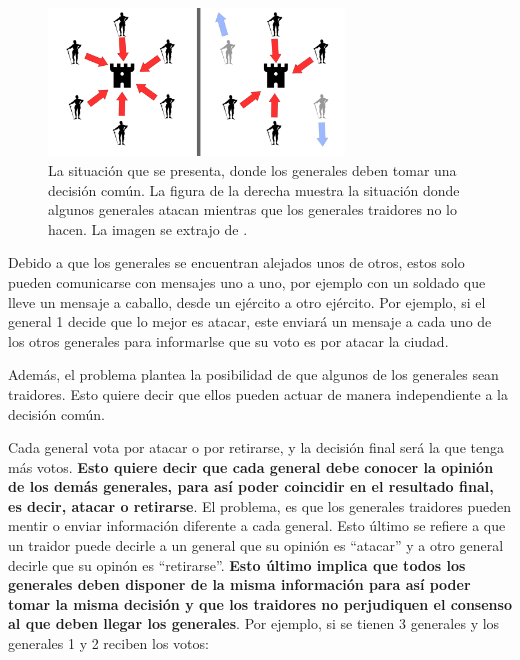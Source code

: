 \begin{figure}[H]
    \centering
    \includegraphics[width=0.7\textwidth]{img/Byzantine_Generals_Problem.png}
    \caption{La situación que se presenta, donde los generales deben tomar una decisión común. La figura de la derecha muestra la situación donde algunos generales atacan mientras que los generales traidores no lo hacen. La imagen se extrajo de \cite{wikipedia-contributors-2023}.}
    \label{fig:Byzantine_Generales_Problem}    
\end{figure}


Debido a que los generales se encuentran alejados unos de otros, estos solo pueden comunicarse con mensajes uno a uno, por ejemplo con un soldado que lleve un mensaje a caballo, desde un ejército a otro ejército. Por ejemplo, si el general 1 decide que lo mejor es atacar, este enviará un mensaje a cada uno de los otros generales para informarlse que su voto es por atacar la ciudad.

Además, el problema plantea la posibilidad de que algunos de los generales sean traidores. Esto quiere decir que ellos pueden actuar de manera independiente a la decisión común.

Cada general vota por atacar o por retirarse, y la decisión final será la que tenga más votos. \textbf{Esto quiere decir que cada general debe conocer la opinión de los demás generales, para así poder coincidir en el resultado final, es decir, atacar o retirarse}. El problema, es que los generales traidores pueden mentir o enviar información diferente a cada general. Esto último se refiere a que un traidor puede decirle a un general que su opinión es ``atacar'' y a otro general decirle que su opinón es ``retirarse''. \textbf{Esto último implica que todos los generales deben disponer de la misma información para así poder tomar la misma decisión y que los traidores no perjudiquen el consenso al que deben llegar los generales}. Por ejemplo, si se tienen 3 generales y los generales 1 y 2 reciben los votos:


